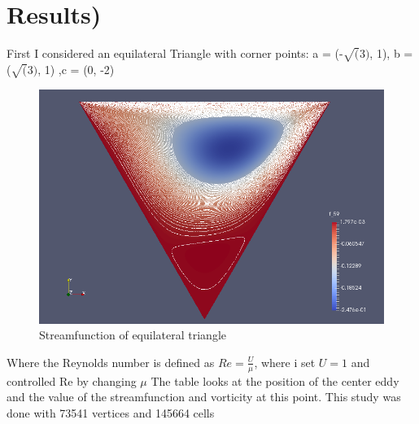 \documentclass[a4paper,norsk]{article}
\begin{document}
\section*{Results)}
First I considered an equilateral Triangle with corner points: \newline
a = (-$\sqrt(3)$, 1), b = ($\sqrt(3)$, 1) ,c = (0, -2) \newline
\begin{figure}
    \centering
    \includegraphics[trim = 25mm 0mm 25mm 0mm, clip, scale=0.4]{Equilateral_Re_100.png}
    \caption{Streamfunction of equilateral triangle}
    \label{fig:awesome_image}
\end{figure}
\newline
Where the Reynolds number is defined as $Re = \frac{U}{\mu} $, where i set $U=1$ and controlled Re by changing $\mu$
\newline
The table looks at the position of the center eddy and the value of the streamfunction and vorticity at this point. \newline
This study was done with 73541 vertices and 145664 cells
\newline
\end{document}

